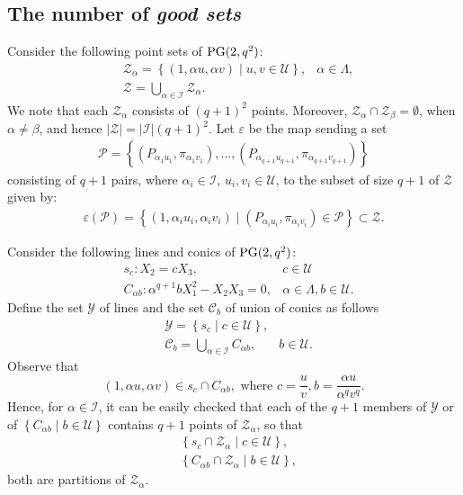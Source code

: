 \documentclass[11pt]{article}
\theoremstyle{definition}
\numberwithin{equation}{section}
\def\eps{\varepsilon}
\def\cC{\mathscr C}
\def\cI{\mathcal I}
\def\cP{\mathcal P}
\def\cU{\mathcal U}
\def\cY{\mathcal Y}
\def\cZ{\mathcal Z}
\def\PG{{\rm PG}}
\begin{document}
\subsection{The number of {\em good sets}}


Consider the following point sets of $\PG(2, q^2)$:
\begin{align*}
    & \cZ_{\alpha} = \left\{ (1, \alpha u, \alpha v) \mid u, v \in \cU \right\}, & \alpha \in \Lambda, \\
    & \cZ = \bigcup_{\alpha \in \cI} \cZ_{\alpha}.
\end{align*}
We note that each $\cZ_{\alpha}$ consists of $(q+1)^2$ points. Moreover, $\mathcal{Z}_{\alpha} \cap \mathcal{Z}_{\beta}=\emptyset$, when $\alpha \neq \beta$, and hence $|\cZ| = |\cI| (q+1)^2$. Let $\eps$ be the map sending a set 
\begin{align*}
    \cP = \left\{\left(P_{\alpha_{1} u_1}, \pi_{\alpha_{1} v_1}\right), \dots, \left(P_{\alpha_{{q+1}} u_{q+1}}, \pi_{\alpha_{{q+1}} v_{q+1}}\right)\right\}
\end{align*} 
consisting of $q+1$ pairs, where $\alpha_{i} \in \cI$, $u_i, v_i \in \cU$, to the subset of size $q+1$ of $\cZ$ given by:
\begin{align*}
    \eps({\cP}) = \left\{ (1, \alpha_{i} u_i, \alpha_{i} v_i) \mid \left(P_{\alpha_{i} u_i}, \pi_{\alpha_{i} v_i}\right) \in \cP \right\} \subset \cZ.
\end{align*}

Consider the following lines and conics  of $\PG(2, q^2)$:
\begin{align*}
    & s_c: X_2 = c X_3, & c \in \cU \\
    & C_{\alpha b}: \alpha^{q+1} b X_1^2 - X_2 X_3 = 0, & \alpha \in \Lambda, b \in \cU.
\end{align*}
Define the set $\cY$ of lines and the set $\cC_b$ of union of conics as follows
\begin{align*}
    & \cY = \left\{s_c \mid c \in \cU \right\}, & \\
    & \cC_{b} = \bigcup_{\alpha \in \cI} C_{\alpha b}, & b \in \cU.
\end{align*}
Observe that 
\begin{equation} \label{eq:belonglineconics}
    \left(1, \alpha u, \alpha v\right) \in s_{c} \cap C_{\alpha b},  \mbox{ where } c = \frac{u}{v}, b = \frac{\alpha u}{\alpha^q v^q}.
\end{equation}
Hence, for $\alpha \in \cI$, it can be easily checked that each of the $q+1$ members of $\cY$ or of $\left\{C_{\alpha b} \mid b \in \cU \right\}$ contains $q+1$ points of $\cZ_{\alpha}$, so that 
\begin{align*}
    & \left\{s_c \cap \cZ_{\alpha} \mid c \in \cU\right\}, \\
    & \left\{C_{\alpha b} \cap \cZ_{\alpha} \mid b \in \cU\right\}, 
\end{align*}
both are partitions of $\cZ_{\alpha}$.
\end{document}
